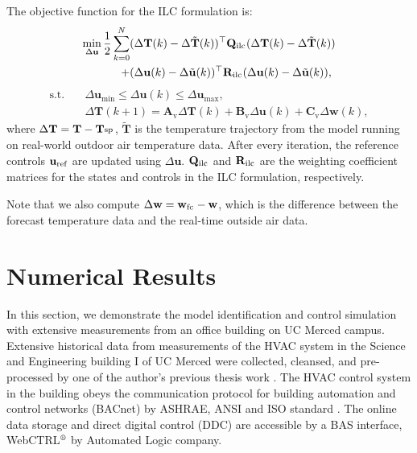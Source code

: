 \documentclass[conference]{IEEEtran}
\begin{document}
The objective function for the ILC formulation is:
\begin{align}
\nonumber
\min\limits_{\Delta\mathbf{u}}\frac{1}{2}\sum_{k=0}^{N}&(\Delta\mathbf{T}(k)-\Delta\tilde{\mathbf{T}}(k))^\top\mathbf{Q}_{\textsuperscript{ilc}}(\Delta\mathbf{T}(k)-\Delta\tilde{\mathbf{T}}(k))\\
+ & (\Delta\mathbf{u}(k)-\Delta\tilde{\mathbf{u}}(k))^\top\mathbf{R}_{\textsuperscript{ilc}}(\Delta\mathbf{u}(k)-\Delta\tilde{\mathbf{u}}(k)), \label{DeltaJ}%
\end{align}
\begin{subequations}
\begin{align}
\textrm{s.t.} \quad & \Delta\mathbf{u}_{\min}\leq\Delta\mathbf{u}(k)\leq\Delta\mathbf{u}_{\max},\label{DeltaBounds}\\
&\Delta\mathbf{T}(k+1) = \mathbf{A}_{\textrm{v}}\Delta\mathbf{T}(k) + \mathbf{B}_{\textrm{v}}\Delta\mathbf{u}(k) + \mathbf{C}_{\textrm{v}}\Delta\mathbf{w}(k),\label{DeltaEqnofDynamicalConstraints}
\end{align}
\end{subequations}
where $\Delta\mathbf{T} = \mathbf{T} - \mathbf{T}_{\textsuperscript{sp}}$, $\tilde{\mathbf{T}}$ is the temperature trajectory from the model running on real-world outdoor air temperature data. After every iteration, the reference controls $\mathbf{u}_{\textsuperscript{ref}}$ are updated using $\Delta\mathbf{u}$. $\mathbf{Q}_{\textsuperscript{ilc}}$ and $\mathbf{R}_{\textsuperscript{ilc}}$ are the weighting coefficient matrices for the states and controls in the ILC formulation, respectively.

Note that we also compute $\Delta\mathbf{w} = \mathbf{w}_\textsuperscript{fc} - \mathbf{w}$, which is the difference between the forecast temperature data and the real-time outside air data.

\section{Numerical Results}
In this section, we demonstrate the model identification and control simulation with extensive measurements from an office building on UC Merced campus. Extensive historical data from measurements of the HVAC system in the Science and Engineering building I of UC Merced were collected, cleansed, and pre-processed by one of the author's previous thesis work \cite{liang2014modeling}. The HVAC control system in the building obeys the communication protocol for building automation and control networks (BACnet) by ASHRAE, ANSI and ISO standard \cite{bushby1997bacnettm}. The online data storage and direct digital control (DDC) are accessible by a BAS interface, WebCTRL$\textsuperscript{\textregistered}$ \cite{webctrl2022alc} by Automated Logic company.
\end{document}
